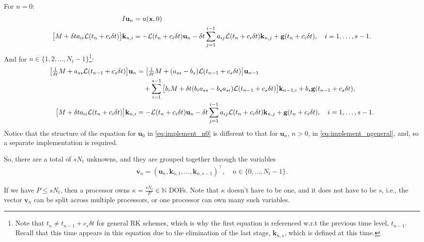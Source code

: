 \documentclass[a4paper,10pt]{article}
\begin{document}
\noindent For $n = 0$:
\begin{align}
\label{eq:implement_n0}
\begin{split}
I \mathbf{u}_n &= u(\mathbf{x},0) \\
\big[ M + \delta t a_{ii} {\cal L}(t_n + c_i \delta t) \big] \mathbf{k}_{n,i} 
&= 
- {\cal L}(t_n + c_i \delta t) \mathbf{u}_{n} 
- \delta t \sum \limits_{j = 1}^{i-1} a_{ij} {\cal L}(t_n + c_i \delta t) \mathbf{k}_{n,j} 
+ \mathbf{g}(t_n + c_i \delta t),
\quad
i = 1,\ldots,s-1.
\end{split}
\end{align}
And for $n \in \{1,2,\ldots,N_t-1\}$\footnote{Note that $t_n \neq t_{n-1} + c_s \delta t $ for general RK schemes, which is why the first equation is referenced w.r.t the previous time level, $t_{n-1}$. Recall that this time appears in this equation due to the elimination of the last stage, $\mathbf{k}_{n,s}$, which is defined at this time.}:
\begin{align} 
\label{eq:implement_ngeneral}
\begin{split}
\big[ 
\tfrac{1}{\delta t} M + a_{ss} {\cal L}(t_{n-1} + c_s \delta t) 
\big] 
\mathbf{u}_{n} 
&= 
\big[ 
\tfrac{1}{\delta t} M + ( a_{ss} - b_s) {\cal L}(t_{n-1} + c_s \delta t) 
\big] 
\mathbf{u}_{n-1} \\
&\quad
+ \sum \limits_{i = 1}^{s-1} 
\big[
b_i M + \delta t  (b_i a_{ss} - b_s a_{si}) {\cal L}(t_{n-1} + c_s \delta t)
\big] \mathbf{k}_{n-1,i}
+
b_s \mathbf{g}(t_{n-1} + c_s \delta t), \\
\big[ M + \delta t a_{ii} {\cal L}(t_n + c_i \delta t) \big] \mathbf{k}_{n,i} 
&= 
- {\cal L}(t_n + c_i \delta t) \mathbf{u}_{n} 
- \delta t \sum \limits_{j = 1}^{i-1} a_{ij} {\cal L}(t_n + c_i \delta t) \mathbf{k}_{n,j} 
+ \mathbf{g}(t_n + c_i \delta t),
\quad
i = 1,\ldots,s-1.
\end{split}
\end{align}
Notice that the structure of the equation for $\mathbf{u}_0$ in \eqref{eq:implement_n0} is different to that for $\mathbf{u}_n$, $n > 0$, in \eqref{eq:implement_ngeneral}, and, so a separate implementation is required.


So, there are a total of $s N_t$ unknowns, and they are grouped together through the variables
\begin{align}
\mathbf{v}_n = (\mathbf{u}_n, \mathbf{k}_{n,1}, \ldots, \mathbf{k}_{n,s-1})^\top, \quad n \in \{0,\ldots,N_t-1\}.
\end{align}

If we have $P \leq s N_t$, then a processor owns  $\kappa = \frac{s N_t}{P} \in \mathbb{N}$ DOFs. Note that $\kappa$ doesn't have to be one, and it does not have to be $s$, i.e., the vector $\mathbf{v}_n$ can be split across multiple processors, or one processor can own many such variables. 
\end{document}
